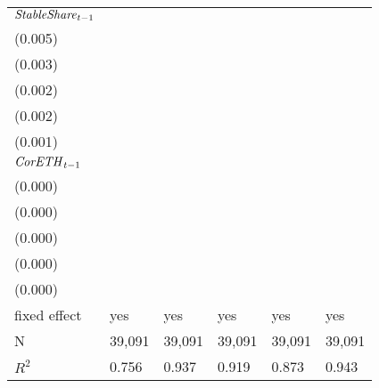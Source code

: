 \begin{tabular}{llllll}
${{\it StableShare}}_{t-1}$  &  \makecell{$0.145^{***}$ \\ (0.005)} &    \makecell{$-0.004^{}$ \\ (0.003)} &  \makecell{$-0.007^{***}$ \\ (0.002)} &  \makecell{$0.031^{***}$ \\ (0.002)} &   \makecell{$0.013^{***}$ \\ (0.001)} \\
${{\it CorETH}}_{t-1}$       &    \makecell{$-0.000^{}$ \\ (0.000)} &     \makecell{$0.000^{}$ \\ (0.000)} &      \makecell{$0.000^{}$ \\ (0.000)} &   \makecell{$0.000^{**}$ \\ (0.000)} &     \makecell{$-0.000^{}$ \\ (0.000)} \\
\midrule fixed effect        &                                  yes &                                  yes &                                   yes &                                  yes &                                   yes \\
N                            &                               39,091 &                               39,091 &                                39,091 &                               39,091 &                                39,091 \\
$R^2$                        &                                0.756 &                                0.937 &                                 0.919 &                                0.873 &                                 0.943 \\
\bottomrule
\end{tabular}
